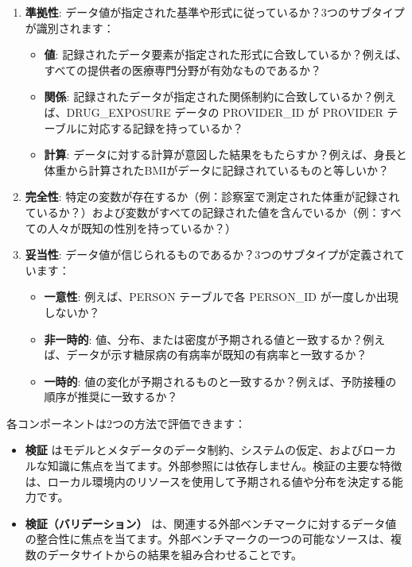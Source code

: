 \documentclass[
  11pt]{book}
\providecommand{\tightlist}{%
  \setlength{\itemsep}{0pt}\setlength{\parskip}{0pt}}
\theoremstyle{definition}
\theoremstyle{definition}
\theoremstyle{definition}
\theoremstyle{definition}
\theoremstyle{remark}
\begin{document}
\begin{enumerate}
\def\labelenumi{\arabic{enumi}.}
\item
  \textbf{準拠性}: データ値が指定された基準や形式に従っているか？3つのサブタイプが識別されます：

  \begin{itemize}
  \tightlist
  \item
    \textbf{値}: 記録されたデータ要素が指定された形式に合致しているか？例えば、すべての提供者の医療専門分野が有効なものであるか？
  \item
    \textbf{関係}: 記録されたデータが指定された関係制約に合致しているか？例えば、DRUG\_EXPOSURE データの PROVIDER\_ID が PROVIDER テーブルに対応する記録を持っているか？
  \item
    \textbf{計算}: データに対する計算が意図した結果をもたらすか？例えば、身長と体重から計算されたBMIがデータに記録されているものと等しいか？
  \end{itemize}
\item
  \textbf{完全性}: 特定の変数が存在するか（例：診察室で測定された体重が記録されているか？）および変数がすべての記録された値を含んでいるか（例：すべての人々が既知の性別を持っているか？）
\item
  \textbf{妥当性}: データ値が信じられるものであるか？3つのサブタイプが定義されています：

  \begin{itemize}
  \tightlist
  \item
    \textbf{一意性}: 例えば、PERSON テーブルで各 PERSON\_ID が一度しか出現しないか？
  \item
    \textbf{非一時的}: 値、分布、または密度が予期される値と一致するか？例えば、データが示す糖尿病の有病率が既知の有病率と一致するか？
  \item
    \textbf{一時的}: 値の変化が予期されるものと一致するか？例えば、予防接種の順序が推奨に一致するか？
  \end{itemize}

    
\end{enumerate}

各コンポーネントは2つの方法で評価できます：

\begin{itemize}
\tightlist
\item
  \textbf{検証} はモデルとメタデータのデータ制約、システムの仮定、およびローカルな知識に焦点を当てます。外部参照には依存しません。検証の主要な特徴は、ローカル環境内のリソースを使用して予期される値や分布を決定する能力です。
\item
  \textbf{検証（バリデーション）} は、関連する外部ベンチマークに対するデータ値の整合性に焦点を当てます。外部ベンチマークの一つの可能なソースは、複数のデータサイトからの結果を組み合わせることです。
\end{itemize}
\end{document}
